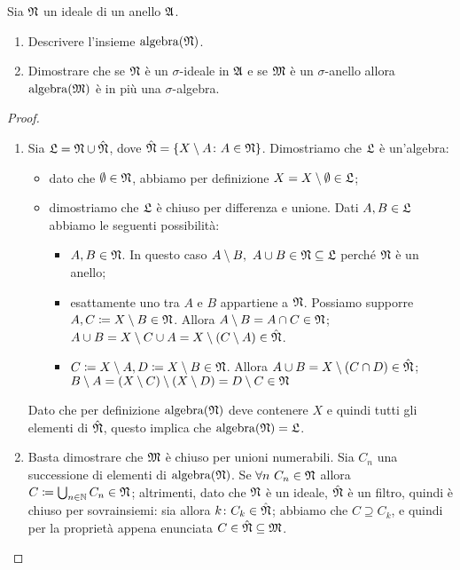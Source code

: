 \documentclass[../EserciziIstituzioniAnalisi.tex]{subfiles}
\begin{document}
\begin{exercise}[13/10/2016]
  Sia $\mathfrak N$ un ideale di un anello $\mathfrak A$.
  \begin{enumerate}
    \item Descrivere l'insieme $\operatorname{algebra}(\mathfrak N)$.
    \item Dimostrare che se $\mathfrak N$ è un $\sigma$-ideale in $\mathfrak A$ e se $\mathfrak M$ è un $\sigma$-anello allora $\operatorname{algebra}(\mathfrak M)$ è in più una $\sigma$-algebra.
  \end{enumerate}
\end{exercise}
\begin{proof}
  \begin{enumerate}
    \item Sia $\mathfrak L=\mathfrak N \cup \hat{\mathfrak N}$, dove $\hat{\mathfrak N}=\left\{ X\setminus A \colon A\in \mathfrak N  \right\}$. Dimostriamo che $\mathfrak L$ è un'algebra:
    \begin{itemize}
      \item dato che $\emptyset \in \mathfrak N$, abbiamo per definizione $X=X\setminus \emptyset\in \mathfrak L$; 
      \item dimostriamo che $\mathfrak L$ è chiuso per differenza e unione. Dati $A,B\in \mathfrak L$ abbiamo le seguenti possibilità:
      \begin{itemize}
        \item $A,B\in\mathfrak N$. In questo caso $A\setminus B,\ A\cup B\in\mathfrak N\subseteq\mathfrak L$ perché $\mathfrak N$ è un anello;
        \item esattamente uno tra $A$ e $B$ appartiene a $\mathfrak N$. Possiamo supporre $A, C\coloneqq X\setminus B \in\mathfrak N$. Allora $A\setminus B=A\cap C\in \mathfrak N$; $A\cup B=X\setminus C \cup A=X\setminus(C\setminus A)\in \hat {\mathfrak N}$.
        \item $C\coloneqq X\setminus A, D\coloneqq X\setminus B\in \mathfrak N$. Allora $A\cup B=X\setminus (C\cap D)\in\hat{\mathfrak N}$; $B\setminus A=(X\setminus C)\setminus(X\setminus D)=D\setminus C \in \mathfrak N$
      \end{itemize}
    \end{itemize}
    Dato che per definizione $\operatorname{algebra}(\mathfrak N)$ deve contenere $X$ e quindi tutti gli elementi di $\hat{\mathfrak N}$, questo implica che  $\operatorname{algebra}(\mathfrak N)=\mathfrak L$.
    \item Basta dimostrare che $\mathfrak M$ è chiuso per unioni numerabili. Sia $C_n$ una successione di elementi di $\operatorname{algebra}(\mathfrak N)$. Se $\forall n\ C_n\in\mathfrak N$ allora $C\coloneqq\bigcup_{n\in\mathbb N}C_n\in\mathfrak N$; altrimenti, dato che $\mathfrak N$ è un ideale, $\hat{\mathfrak N}$ è un filtro, quindi è chiuso per sovrainsiemi: sia allora $k\colon C_k\in\hat{\mathfrak N}$; abbiamo che $C\supseteq C_k$, e quindi per la proprietà appena enunciata $C\in\hat{\mathfrak N}\subseteq \mathfrak M$.
  \end{enumerate}
\end{proof}
\end{document}
